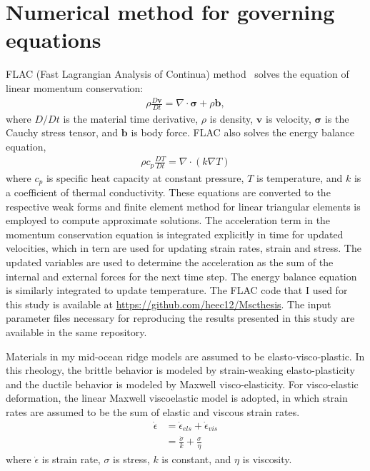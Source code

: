\documentclass[letterpaper,12pt,notitle]{memphisthesis}                     %
\begin{document}
\section{Numerical method for governing equations}
FLAC (Fast Lagrangian Analysis of Continua) method~\citep{Cundall1982, Poliakov1993, Lavier2002} solves the equation of linear momentum conservation:
\begin{align}
\rho \frac{D \mathbf{v}}{Dt} = \nabla \cdot \boldsymbol{\sigma} + \rho \mathbf{b},
\end{align}
where $D/Dt$ is the material time derivative, $\rho$ is density, $\mathbf{v}$ is velocity, $\boldsymbol{\sigma}$ is the Cauchy stress tensor, and $\mathbf{b}$ is body force. %
FLAC also solves the energy balance equation,
\begin{align}
\rho c_{p} \frac{D T}{D t} = \nabla \cdot ( k \nabla T)
\end{align}
where $c_{p}$ is specific heat capacity at constant pressure, $T$ is temperature, and $k$ is a coefficient of thermal conductivity. 
%
These equations are converted to the respective weak forms and finite element method for linear triangular elements is employed to compute approximate solutions. The acceleration term in the momentum conservation equation is integrated explicitly in time for updated velocities, which in tern are used for updating strain rates, strain and stress. The updated variables are used to determine the acceleration as the sum of the internal and external forces for the next time step. The energy balance equation is similarly integrated to update temperature. The FLAC code that I used for this study is available at \url{https://github.com/heec12/Mscthesis}. The input parameter files necessary for reproducing the results presented in this study are available in the same repository.

Materials in my mid-ocean ridge models are assumed to be elasto-visco-plastic. In this rheology, the brittle behavior is modeled by strain-weaking elasto-plasticity and the ductile behavior is modeled by Maxwell visco-elasticity. 
For visco-elastic deformation, the linear Maxwell viscoelastic model is adopted, in which strain rates are assumed to be the sum of elastic and viscous strain rates.
\begin{align} \label{srate}
  \dot{\epsilon} &=  {\dot{\epsilon}}_{els} +  {\dot{\epsilon}}_{vis} \\
                        &= \frac{ \dot{\sigma}}{k} + \frac{\sigma}{\eta}
\end{align}
where $\dot{\epsilon}$ is strain rate, $\sigma$ is stress, $k$ is constant, and $\eta$ is viscosity.
%
\end{document}
